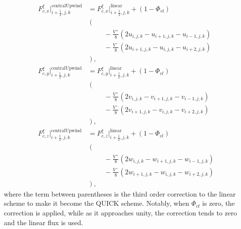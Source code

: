 \begin{align}
	F^\xi_{c,x}\bigg|^\text{centralUpwind}_{i+\frac{1}{2},j,k} &= F^\xi_{c,x}\bigg|^\text{linear}_{i+\frac{1}{2},j,k} + (1-\Phi_{vl}) \nonumber \\
	&\left( \right. \nonumber \\
		&\hspace{1cm}-\frac{V^+}{8}\left(2u_{i,j,k} - u_{i+1,j,k} - u_{i-1,j,k}\right) \nonumber \\
		&\hspace{1cm}-\frac{V^-}{8}\left(2u_{i+1,j,k} - u_{i,j,k} - u_{i+2,j,k}\right) \nonumber \\
	&\left.\right), \nonumber \\ 
	F^\xi_{c,y}\bigg|^\text{centralUpwind}_{i+\frac{1}{2},j,k} &= F^\xi_{c,y}\bigg|^\text{linear}_{i+\frac{1}{2},j,k} + (1-\Phi_{vl}) \nonumber \\
	&\left( \right. \nonumber \\
	&\hspace{1cm}-\frac{V^+}{8}\left(2v_{i,j,k} - v_{i+1,j,k} - v_{i-1,j,k}\right) \nonumber \\
	&\hspace{1cm}-\frac{V^-}{8}\left(2v_{i+1,j,k} - v_{i,j,k} - v_{i+2,j,k}\right) \nonumber \\
	&\left.\right), \nonumber \\
	F^\xi_{c,z}\bigg|^\text{centralUpwind}_{i+\frac{1}{2},j,k} &= F^\xi_{c,z}\bigg|^\text{linear}_{i+\frac{1}{2},j,k} + (1-\Phi_{vl}) \nonumber \\
	&\left( \right. \nonumber \\
	&\hspace{1cm}-\frac{V^+}{8}\left(2w_{i,j,k} - w_{i+1,j,k} - w_{i-1,j,k}\right) \nonumber \\
	&\hspace{1cm}-\frac{V^-}{8}\left(2w_{i+1,j,k} - w_{i,j,k} - w_{i+2,j,k}\right) \nonumber \\
	&\left.\right), \label{eq:centralUpwindFluxes}
\end{align}
where the term between parentheses is the third order correction to the linear scheme to make it become the QUICK scheme. Notably, when $\Phi_{vl}$ is zero, the correction is applied, while as it approaches unity, the correction tends to zero and the linear flux is used. 

